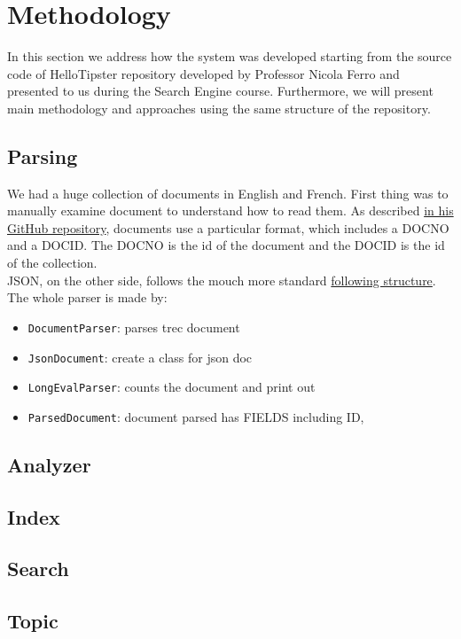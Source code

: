 \section{Methodology}
\label{sec:methodology}
In this section we address how the system was developed starting from the source code of
HelloTipster\cite{tipser} repository developed by Professor Nicola Ferro
and presented to us during the Search Engine course.
Furthermore, we will present main methodology and approaches
using the same structure of the repository\cite{jihuming}.

\subsection{Parsing}
We had a huge collection of documents in English and French. First thing
was to manually examine document to understand how to read them. As described
\href{https://github.com/joaopalotti/trectools}{in his GitHub repository},
documents use a particular format, which includes a DOCNO and a DOCID.
The DOCNO is the id of the document and the DOCID is the id of the collection.\\
JSON, on the other side, follows the mouch more standard
\href{https://github.com/castorini/anserini/issues/1111}{following structure}.\\
The whole parser is made by:
\begin{itemize}
    \item \texttt{DocumentParser}: parses trec document
    \item \texttt{JsonDocument}: create a class for json doc
    \item \texttt{LongEvalParser}: counts the document and print out
    \item \texttt{ParsedDocument}: document parsed has FIELDS including ID, %
\end{itemize}
\subsection{Analyzer}

\subsection{Index}

\subsection{Search}

\subsection{Topic}
